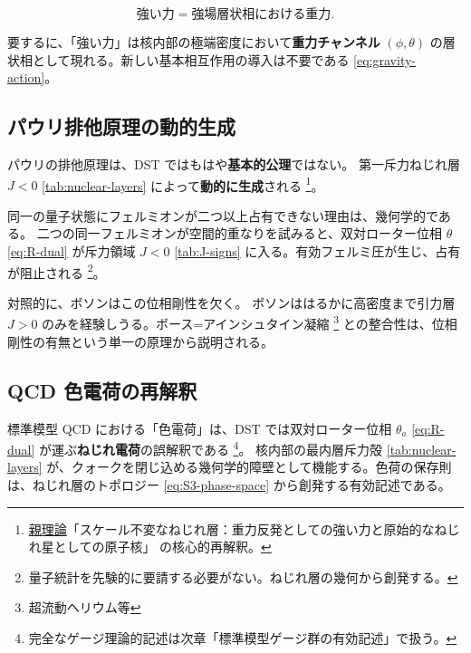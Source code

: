 \documentclass[dvipdfmx,a4paper,oneside]{jsbook}
\numberwithin{equation}{chapter}
\begin{document}
\begin{equation}
  \boxed{\;
  \text{強い力} = \text{強場層状相における重力}.
  \;}
  \label{eq:nuclear-strong-is-gravity}
\end{equation}

要するに、「強い力」は核内部の極端密度において\textbf{重力チャンネル} \((\phi, \theta)\) の層状相として現れる。新しい基本相互作用の導入は不要である \eqref{eq:gravity-action}。

\subsection{パウリ排他原理の動的生成}

パウリの排他原理は、DST ではもはや\textbf{基本的公理}ではない。
第一斥力ねじれ層 \(J < 0\) \eqref{tab:nuclear-layers} によって\textbf{動的に生成}される \footnote{\hyperref[sec:sister-manuscripts]{親理論}「スケール不変なねじれ層：重力反発としての強い力と原始的なねじれ星としての原子核」 の核心的再解釈。}。

同一の量子状態にフェルミオンが二つ以上占有できない理由は、幾何学的である。
二つの同一フェルミオンが空間的重なりを試みると、双対ローター位相 \(\theta\) \eqref{eq:R-dual} が斥力領域 \(J < 0\) \eqref{tab:J-signs} に入る。有効フェルミ圧が生じ、占有が阻止される \footnote{量子統計を先験的に要請する必要がない。ねじれ層の幾何から創発する。}。

対照的に、ボソンはこの位相剛性を欠く。
ボソンははるかに高密度まで引力層 \(J > 0\) のみを経験しうる。ボース=アインシュタイン凝縮 \footnote{超流動ヘリウム等} との整合性は、位相剛性の有無という単一の原理から説明される。

\subsection{QCD 色電荷の再解釈}

標準模型 QCD における「色電荷」は、DST では双対ローター位相 \(\theta_a\) \eqref{eq:R-dual} が運ぶ\textbf{ねじれ電荷}の誤解釈である \footnote{完全なゲージ理論的記述は次章「標準模型ゲージ群の有効記述」で扱う。}。
核内部の最内層斥力殻 \eqref{tab:nuclear-layers} が、クォークを閉じ込める幾何学的障壁として機能する。色荷の保存則は、ねじれ層のトポロジー \eqref{eq:S3-phase-space} から創発する有効記述である。
\end{document}
